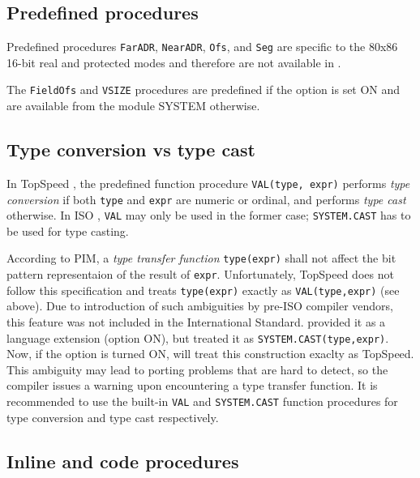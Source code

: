 \subsection{Predefined procedures}

     Predefined procedures \verb'FarADR', \verb'NearADR', \verb'Ofs', and 
     \verb'Seg' are specific to the 80x86 16-bit real and protected modes
     and therefore are not available in \XDS{}.

     The \verb'FieldOfs' and \verb'VSIZE' procedures are predefined if the
     option  is set ON and are available from the module SYSTEM
     otherwise.

\subsection{Type conversion vs type cast}

     In TopSpeed \mt{}, the predefined function procedure 
     \verb'VAL(type, expr)' performs {\em type conversion} if both \verb'type'
     and \verb'expr' are numeric or ordinal, and performs {\em type cast}
     otherwise. In ISO \mt{}, \verb'VAL' may only be used in the former case;
     \verb'SYSTEM.CAST' has to be used for type casting.

     According to PIM, a {\em type transfer function} \verb'type(expr)' shall 
     not affect the bit pattern representaion of the result of \verb'expr'.
     Unfortunately, TopSpeed does not follow this specification and treats
     \verb'type(expr)' exactly as \verb'VAL(type,expr)' (see above).
     Due to introduction of such ambiguities by pre-ISO compiler vendors, 
     this feature was not included in the International Standard. 
     \xds{} provided it as a language extension (option 
      ON), but treated it as \verb'SYSTEM.CAST(type,expr)'.
     Now, if the  option is turned ON, \xds{} will treat this
     construction exaclty as TopSpeed. This ambiguity may lead to porting 
     problems that are hard to detect, so the compiler issues a warning
     upon encountering a type transfer function.
     It is recommended to use the built-in \verb'VAL' and \verb'SYSTEM.CAST' 
     function procedures for type conversion and type cast respectively. 

\subsection{Inline and code procedures}

